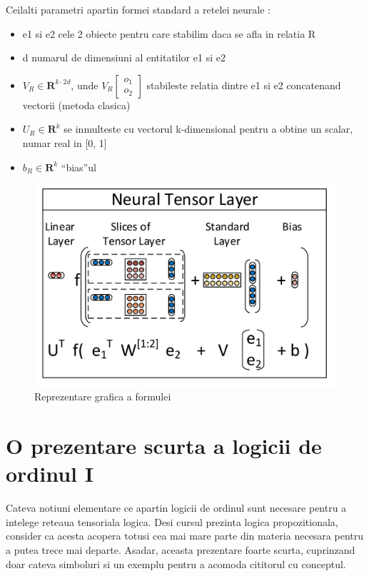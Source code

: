 \documentclass{article}
\begin{document}
Ceilalti parametri apartin formei standard a retelei neurale \cite{NTN}:\\
\begin{itemize}
	\item e1 si e2 cele 2 obiecte pentru care stabilim daca se afla in relatia R
	\item d numarul de dimensiuni al entitatilor e1 si e2
	\item $V_R \in \mathbf{R}^{k \cdot 2d}$, unde $V_R \left[\begin{smallmatrix} o_1 \\ o_2 \end{smallmatrix}\right]$ stabileste relatia dintre e1 si e2 concatenand vectorii (metoda clasica)
	\item $U_R \in \mathbf{R}^k$ se inmulteste cu vectorul k-dimensional pentru a obtine un scalar, numar real in [0, 1]
	\item $b_R \in \mathbf{R}^k$ ``bias''ul
\end{itemize}

\begin{figure}[H]
	\includegraphics[scale=0.15]{ntn_rep}
	\caption{Reprezentare grafica a formulei \cite{NTN}}
\end{figure}

\section{O prezentare scurta a logicii de ordinul I}
Cateva notiuni elementare ce apartin logicii de ordinul sunt necesare pentru a intelege reteaua tensoriala logica. Desi cursul prezinta logica propozitionala, consider ca acesta acopera totusi cea mai mare parte din materia necesara pentru a putea trece mai departe. Asadar, aceasta prezentare foarte scurta, cuprinzand doar cateva simboluri si un exemplu pentru a acomoda cititorul cu conceptul.
\end{document}
